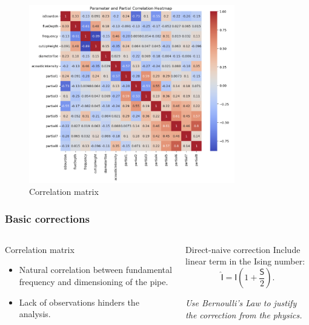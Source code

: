 \documentclass{beamer}
\begin{document}
    \begin{frame}
        \centering
        \begin{figure}[htbp]
            \includegraphics[width=0.8\textwidth]{pic2.png}
            \caption{Correlation matrix}
            \label{fig:distribution_partials}
        \end{figure}
    \end{frame}

    \begin{frame}
        \frametitle{Basic corrections}
        \begin{columns}
            \begin{column}{0.5\textwidth}
                \begin{alertblock}{Correlation matrix}
                    \begin{itemize}
                        \item Natural correlation between fundamental frequency
                            and dimensioning of the pipe.
                        \item Lack of observations hinders the analysis.
                    \end{itemize}
                \end{alertblock}
            \end{column}
            \begin{column}{0.5\textwidth}
                \begin{block}{Direct-naive correction}
                    Include linear term in the Ising number:
                    \[
                        \hat{\mathsf{I}} =
                        \mathsf{I}\left(1 + \frac{\mathsf{S}}{2}\right).
                    \]

                    \emph{Use Bernoulli's Law to justify the correction from
                    the physics.}
                \end{block}
            \end{column}
        \end{columns}
    \end{frame}
\end{document}
